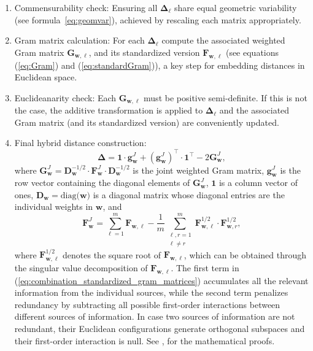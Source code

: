 \begin{enumerate}
\item Commensurability check: Ensuring all $\mathbf{\Delta}_\ell$ share equal geometric variability (see formula~\ref{eq:geomvar}), achieved by rescaling each matrix appropriately.
\item Gram matrix calculation: For each $\mathbf{\Delta}_\ell$ compute the associated weighted Gram matrix $\mathbf{G}_{\mathbf{w},\ell}$, and its standardized version $\mathbf{F}_{\mathbf{w},\ell}$ (see equations (\ref{eq:Gram}) and (\ref{eq:standardGram})), a key step for embedding distances in Euclidean space.
\item Euclideanarity check: Each $\mathbf{G}_{\mathbf{w},\ell}$ must be positive semi-definite. If this is not the case, the additive transformation is applied to $\mathbf{\Delta}_\ell$ and the associated Gram matrix (and its standardized version) are conveniently updated.
\item Final hybrid distance construction:
\[
\mathbf{\Delta} = \mathbf{1} \cdot \mathbf{g}_{\mathbf{w}}^{J} + \left ( \mathbf{g}_{\mathbf{w}}^{J} \right )^\top \cdot \mathbf{1}^\top - 2\mathbf{G}_{\mathbf{w}}^{J},
\]
where $\mathbf{G}_{\mathbf{w}}^{J} = \mathbf{D}_{\mathbf{w}}^{-1/2} \cdot \mathbf{F}_{\mathbf{w}}^{J} \cdot \mathbf{D}_{\mathbf{w}}^{-1/2}$ is the joint weighted Gram matrix, $\mathbf{g}_{\mathbf{w}}^{J}$ is the row vector containing the diagonal elements of $\mathbf{G}_{\mathbf{w}}^{J}$, $\mathbf{1}$ is a column vector of ones, $\mathbf{D_w} = \text{diag($\mathbf{w}$)}$ is a diagonal matrix whose diagonal entries are the individual weights in $\mathbf{w}$, and
\begin{equation}
\label{eq:combination_standardized_gram_matrices}
\mathbf{F}_\mathbf{w}^J = \sum_{\ell = 1}^{m} \mathbf{F}_{\mathbf{w}, \ell} - \frac{1}{m} \sum_{\substack{\ell, r = 1 \\ \ell \ne r}}^{m} \mathbf{F}_{\mathbf{w}, \ell}^{1/2} \cdot \mathbf{F}_{\mathbf{w}, r}^{1/2},
\end{equation}
where $\mathbf{F}_{\mathbf{w}, \ell}^{1/2}$ denotes the square root of $\mathbf{F}_{\mathbf{w}, \ell}$, which can be obtained through the singular value decomposition of $\mathbf{F}_{\mathbf{w}, \ell}$. The first term in (\ref{eq:combination_standardized_gram_matrices}) accumulates all the relevant information from the individual sources, while the second term penalizes redundancy by subtracting all possible first-order interactions between different sources of information. In case two sources of information are not redundant, their Euclidean configurations generate orthogonal subspaces and their first-order interaction is null. See \cite{albarran2015profile}, for the mathematical proofs.
\end{enumerate}

